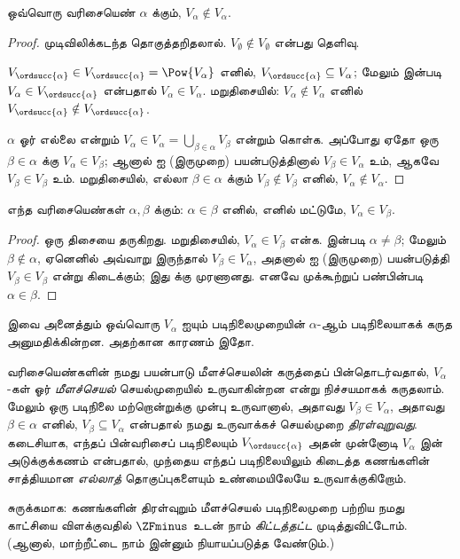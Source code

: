 \documentclass[../../../include/open-logic-section]{subfiles}
\begin{document}
\begin{lem}
ஒவ்வொரு வரிசையெண் $\alpha$ க்கும், $V_\alpha \notin V_\alpha$.
\end{lem}

\begin{proof}
முடிவிலிக்கடந்த தொகுத்தறிதலால். $V_\emptyset \notin V_\emptyset$
என்பது தெளிவு.

$V_{\ordsucc{\alpha}} \in V_{\ordsucc{\alpha}} = \Pow{V_\alpha}$
எனில், $V_{\ordsucc{\alpha}} \subseteq V_\alpha$; மேலும்
 இன்படி $V_\alpha \in
V_{\ordsucc{\alpha}}$ என்பதால் $V_\alpha \in V_\alpha$.
மறுதிசையில்: $V_\alpha \notin V_\alpha$ எனில்
$V_{\ordsucc{\alpha}} \notin V_{\ordsucc{\alpha}}$.

$\alpha$ ஓர் எல்லை என்றும் $V_\alpha \in V_\alpha =
\bigcup_{\beta \in \alpha}V_\beta$ என்றும் கொள்க. அப்போது ஏதோ ஒரு
$\beta \in \alpha$ க்கு $V_\alpha \in V_\beta$; ஆனால்
 ஐ (இருமுறை) பயன்படுத்தினால்
$V_\beta \in V_\alpha$ உம், ஆகவே $V_\beta \in V_\beta$ உம்.
மறுதிசையில், எல்லா $\beta \in \alpha$ க்கும் $V_\beta \notin
V_\beta$ எனில், $V_\alpha \notin V_\alpha$.
\end{proof}

\begin{cor}
எந்த வரிசையெண்கள் $\alpha, \beta$ க்கும்:
$\alpha \in \beta$ எனில், எனில் மட்டுமே, $V_\alpha \in V_\beta$.
\end{cor}

\begin{proof}
ஒரு திசையை  தருகிறது. மறுதிசையில்,
$V_\alpha \in V_\beta$ என்க.  இன்படி
$\alpha \neq \beta$; மேலும் $\beta \notin \alpha$, ஏனெனில் அவ்வாறு
இருந்தால் $V_\beta \in V_\alpha$, அதனால்
 ஐ (இருமுறை) பயன்படுத்தி $V_\beta \in
V_\beta$ என்று கிடைக்கும்; இது  க்கு முரணானது.
எனவே முக்கூற்றுப் பண்பின்படி $\alpha \in \beta$.
\end{proof}
\noindent
இவை அனைத்தும் ஒவ்வொரு $V_\alpha$ ஐயும் படிநிலைமுறையின் $\alpha$-ஆம்
படிநிலையாகக் கருத அனுமதிக்கின்றன. அதற்கான காரணம் இதோ.

வரிசையெண்களின் நமது பயன்பாடு மீளச்செயலின் கருத்தைப் பின்தொடர்வதால்,
$V_\alpha$-கள் ஓர் \emph{மீளச்செயல்} செயல்முறையில் உருவாகின்றன என்று
நிச்சயமாகக் கருதலாம். மேலும் ஒரு படிநிலை மற்றொன்றுக்கு முன்பு
உருவானால், அதாவது $V_\beta \in V_\alpha$, அதாவது $\beta \in
\alpha$ எனில், $V_\beta \subseteq V_\alpha$ என்பதால் நமது உருவாக்கச்
செயல்முறை \emph{திரள்வுறுவது}. கடைசியாக, எந்தப் பின்வரிசைப் படிநிலையும்
$V_{\ordsucc{\alpha}}$ அதன் முன்னோடி $V_\alpha$ இன் அடுக்குக்கணம்
என்பதால், முந்தைய எந்தப் படிநிலையிலும் கிடைத்த கணங்களின் சாத்தியமான
\emph{எல்லாத்} தொகுப்புகளையும் உண்மையிலேயே உருவாக்குகிறோம்.

சுருக்கமாக: கணங்களின் திரள்வுறும் மீளச்செயல் படிநிலைமுறை பற்றிய நமது
காட்சியை விளக்குவதில் $\ZFminus$ உடன் நாம் \emph{கிட்டத்தட்ட}
முடித்துவிட்டோம். (ஆனால், மாற்றீட்டை நாம் இன்னும் நியாயப்படுத்த வேண்டும்.)
\end{document}
